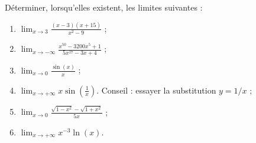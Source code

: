 
\begin{exercice}\label{exoDS_2010_4bis}

Déterminer, lorsqu'elles existent, les limites suivantes :
\begin{enumerate}
\item 
  $\displaystyle \lim_{x\to 3} \frac{(x-3)(x+15)}{x^2-9}$ ;
  \item
    $\displaystyle \lim_{x\to -\infty}\frac{x^{50}-3200x^{5}+1}{5x^{17}-3x+4}$ ;
    \item
      $\displaystyle \lim_{x\to 0}\frac{\sin (x)}{x}$ ;
      \item
        $\displaystyle \lim_{x\to +\infty} x \sin (\frac{1}{x})$. Conseil : essayer la substitution $y=1/x$ ;
        \item
          $\displaystyle \lim_{x\to 0}\frac{\sqrt{1-x^2}-\sqrt{1+x^2}}{5x}$ ;
          \item
          $\displaystyle \lim_{x\to +\infty} x^{-3}\ln(x)$.
          
\end{enumerate}


\end{exercice}
